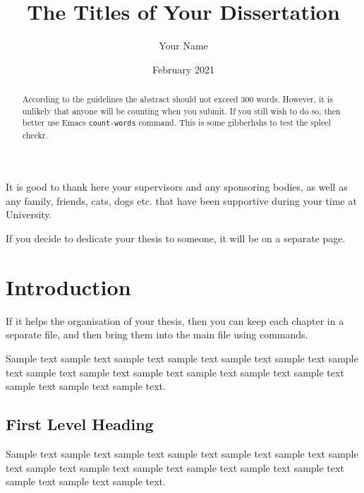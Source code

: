 \documentclass[11pt]{uonthesis}
\title{The Titles of Your Dissertation}
\author{Your Name}
\date{February 2021}
\begin{document}
\begin{frontmatter}
\maketitle
\tableofcontents

\begin{abstract}
According to the guidelines the abstract should not exceed 300 words.
However, it is unlikely that anyone will be counting when you submit.
If you still wish to do so, then better use Emacs \verb|count-words|
command. This is some gibberhshs to test the spleel checkr.
\end{abstract}

\begin{acknowledgements}
It is good to thank here your supervisors and any sponsoring bodies,
as well as any family, friends, cats, dogs etc. that have been
supportive during your time at University.
\end{acknowledgements}

\begin{dedication}
If you decide to dedicate your thesis to someone, it will be on a
separate page.
\end{dedication}

\end{frontmatter}

\chapter{Introduction}

If it helps the organisation of your thesis, then you can keep each
chapter in a separate file, and then bring them into the main 
file using \verb|| commands.

Sample text sample text sample text sample text sample text sample
text sample text sample text sample text sample text sample text
sample text sample text sample text sample text sample text.


\section{First Level Heading}

Sample text sample text sample text sample text sample text sample
text sample text sample text sample text sample text sample text
sample text sample text sample text sample text sample text.
\end{document}
